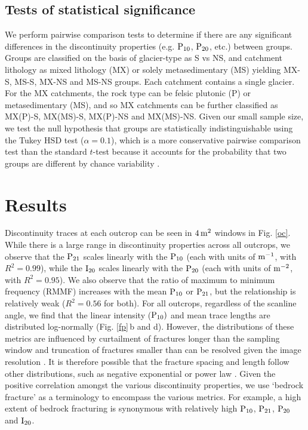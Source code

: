 \documentclass[draft,linenumbers]{agujournal}
\begin{document}
\subsection{Tests of statistical significance}

We perform pairwise comparison tests to determine if there are any significant differences in the discontinuity properties (e.g. $\rm P_{10}$, $\rm P_{20}$, etc.) between groups. Groups are classified on the basis of glacier-type as S vs NS, and catchment lithology as mixed lithology (MX) or solely metasedimentary (MS) yielding MX-S, MS-S, MX-NS and MS-NS groups. Each catchment contains a single glacier. For the MX catchments, the rock type can be felsic plutonic (P) or metasedimentary (MS), and so MX catchments can be further classified as MX(P)-S, MX(MS)-S, MX(P)-NS and MX(MS)-NS. 
Given our small sample size, we test the null hypothesis that groups are statistically indistinguishable using the Tukey HSD test ($\alpha = 0.1$), which is a more conservative pairwise comparison test than the standard $t$-test because it accounts for the probability that two groups are different by chance variability \citep{Dowdy2011}. 

\section{Results}

Discontinuity traces at each outcrop can be seen in $\rm 4\,m^2$ windows in Fig. \ref{oc}. While there is a large range in discontinuity properties across all outcrops, we observe that the $\rm P_{21}$ scales linearly with the $\rm P_{10}$ (each with units of $\rm m^{-1}$, with $R^2=0.99$), while the $\rm I_{20}$ scales linearly with the $\rm P_{20}$ (each with units of $\rm m^{-2}$, with $R^2=0.95$). We also observe that the ratio of maximum to minimum frequency (RMMF) increases with the mean $\rm P_{10}$ or $\rm P_{21}$, but the relationship is relatively weak ($R^2=0.56$ for both). For all outcrops, regardless of the scanline angle, we find that the linear intensity ($\rm P_{10})$ and mean trace lengths are distributed log-normally (Fig. \ref{fp}\,b and d). However, the distributions of these metrics are influenced by curtailment of fractures longer than the sampling window and truncation of fractures smaller than can be resolved given the image resolution \citep[e.g.][]{Hudson1979}. It is therefore possible that the fracture spacing and length follow other distributions, such as negative exponential \citep[e.g.][]{Hudson1979} or power law \citep[e.g.][]{Bonnet2001}. Given the positive correlation amongst the various discontinuity properties, we use `bedrock fracture' as a terminology to encompass the various metrics. For example, a high extent of bedrock fracturing is synonymous with relatively high $\rm P_{10}$, $\rm P_{21}$, $\rm P_{20}$ and $\rm I_{20}$.
\end{document}
